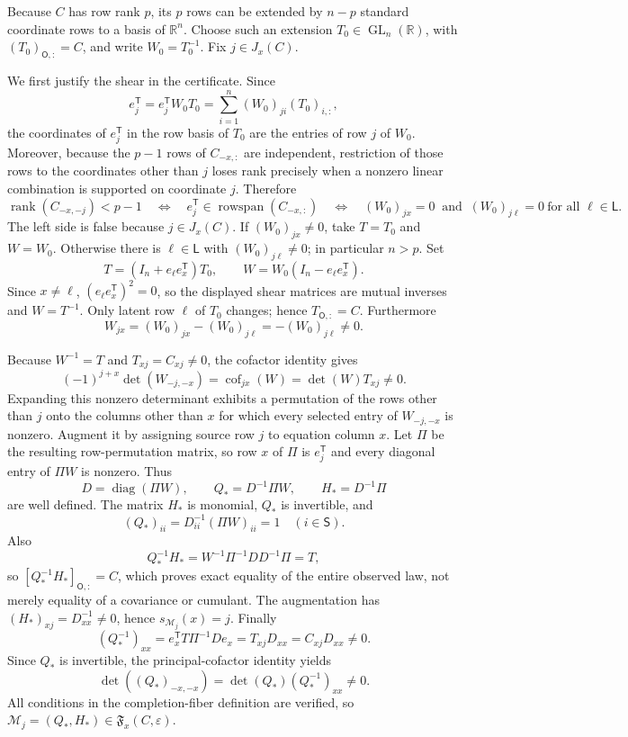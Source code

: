 Because \(C\) has row rank \(p\), its \(p\) rows can be extended by \(n-p\) standard coordinate rows to a basis of \(\mathbb R^n\). Choose such an extension \(T_0\in\operatorname{GL}_n(\mathbb R)\), with \((T_0)_{\mathsf O,:}=C\), and write \(W_0=T_0^{-1}\). Fix \(j\in J_x(C)\).

We first justify the shear in the certificate. Since
\[
 e_j^{\mathsf T}=e_j^{\mathsf T}W_0T_0
 =\sum_{i=1}^n(W_0)_{ji}(T_0)_{i,:},
\]
the coordinates of \(e_j^{\mathsf T}\) in the row basis of \(T_0\) are the entries of row \(j\) of \(W_0\). Moreover, because the \(p-1\) rows of \(C_{-x,:}\) are independent, restriction of those rows to the coordinates other than \(j\) loses rank precisely when a nonzero linear combination is supported on coordinate \(j\). Therefore
\[
 \operatorname{rank}(C_{-x,-j})<p-1
 \quad\Longleftrightarrow\quad
 e_j^{\mathsf T}\in\operatorname{rowspan}(C_{-x,:})
 \quad\Longleftrightarrow\quad
 (W_0)_{jx}=0\ \text{ and }\ (W_0)_{j\ell}=0\ \text{for all }\ell\in\mathsf L.
\]
The left side is false because \(j\in J_x(C)\). If \((W_0)_{jx}\ne0\), take \(T=T_0\) and \(W=W_0\). Otherwise there is \(\ell\in\mathsf L\) with \((W_0)_{j\ell}\ne0\); in particular \(n>p\). Set
\[
 T=(I_n+e_\ell e_x^{\mathsf T})T_0,
 \qquad
 W=W_0(I_n-e_\ell e_x^{\mathsf T}).
\]
Since \(x\ne\ell\), \((e_\ell e_x^{\mathsf T})^2=0\), so the displayed shear matrices are mutual inverses and \(W=T^{-1}\). Only latent row \(\ell\) of \(T_0\) changes; hence \(T_{\mathsf O,:}=C\). Furthermore
\[
 W_{jx}=(W_0)_{jx}-(W_0)_{j\ell}=-(W_0)_{j\ell}\ne0.
\]

Because \(W^{-1}=T\) and \(T_{xj}=C_{xj}\ne0\), the cofactor identity gives
\[
 (-1)^{j+x}\det(W_{-j,-x})
 =\operatorname{cof}_{jx}(W)
 =\det(W)T_{xj}\ne0.
\]
Expanding this nonzero determinant exhibits a permutation of the rows other than \(j\) onto the columns other than \(x\) for which every selected entry of \(W_{-j,-x}\) is nonzero. Augment it by assigning source row \(j\) to equation column \(x\). Let \(\Pi\) be the resulting row-permutation matrix, so row \(x\) of \(\Pi\) is \(e_j^{\mathsf T}\) and every diagonal entry of \(\Pi W\) is nonzero. Thus
\[
 D=\operatorname{diag}(\Pi W),\qquad
 Q_*=D^{-1}\Pi W,\qquad
 H_*=D^{-1}\Pi
\]
are well defined. The matrix \(H_*\) is monomial, \(Q_*\) is invertible, and
\[
 (Q_*)_{ii}=D_{ii}^{-1}(\Pi W)_{ii}=1
 \quad(i\in\mathsf S).
\]
Also
\[
 Q_*^{-1}H_*
 =W^{-1}\Pi^{-1}D D^{-1}\Pi=T,
\]
so \([Q_*^{-1}H_*]_{\mathsf O,:}=C\), which proves exact equality of the entire observed law, not merely equality of a covariance or cumulant. The augmentation has \((H_*)_{xj}=D_{xx}^{-1}\ne0\), hence \(s_{\mathcal M_j}(x)=j\). Finally
\[
 (Q_*^{-1})_{xx}
 =e_x^{\mathsf T}T\Pi^{-1}De_x
 =T_{xj}D_{xx}=C_{xj}D_{xx}\ne0.
\]
Since \(Q_*\) is invertible, the principal-cofactor identity yields
\[
 \det((Q_*)_{-x,-x})=\det(Q_*)(Q_*^{-1})_{xx}\ne0.
\]
All conditions in the completion-fiber definition are verified, so \(\mathcal M_j=(Q_*,H_*)\in\mathfrak F_x(C,\varepsilon)\).

